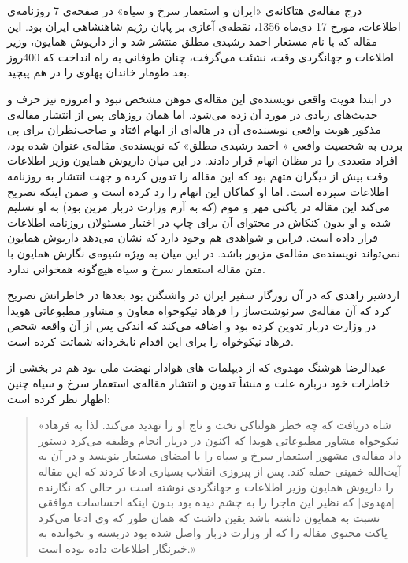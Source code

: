 \documentclass{article}
\begin{document}
\par
درج مقاله‌ی هتاکانه‌ی «ایران و استعمار سرخ و سیاه» در صفحه‌ی 7 روزنامه‌ی اطلاعات، مورخ 17 دی‌ماه 1356، نقطه‌ی آغازی بر پایان رژیم شاهنشاهی ایران بود. این مقاله که با نام مستعار احمد رشیدی مطلق منتشر شد و از داریوش همایون، وزیر اطلاعات و جهانگردی وقت، نشئت می‌گرفت، چنان طوفانی به راه انداخت که 400روز بعد طومار خاندان پهلوی را در هم پیچید.
\par
در ابتدا هویت واقعی نویسنده‌ی این مقاله‌ی موهن مشخص نبود و امروزه نیز حرف و حدیث‌های زیادی در مورد آن زده می‌شود. اما همان روزهای پس از انتشار مقاله‌ی مذكور هويت واقعی نويسنده‌ی آن در هاله‌ای از ابهام افتاد و صاحب‌نظران برای پی بردن به شخصيت واقعی « احمد رشيدی مطلق» كه نويسنده‌ی مقاله‌ی عنوان شده بود، افراد متعددی را در مظان اتهام قرار دادند. در اين ميان داريوش همايون وزير اطلاعات وقت بيش از ديگران متهم بود كه اين مقاله را تدوين كرده و جهت انتشار به روزنامه اطلاعات سپرده است. اما او كماكان اين اتهام را رد كرده است و ضمن اينكه تصريح می‌كند اين مقاله در پاكتی مهر و موم (كه به آرم وزارت دربار مزين بود) به او تسليم شده و او بدون كنكاش در محتوای آن برای چاپ در اختيار مسئولان روزنامه اطلاعات قرار داده است. قراين و شواهدی هم وجود دارد كه نشان می‌دهد داريوش همايون نمی‌تواند نويسنده‌ی مقاله‌ی مزبور باشد. در اين ميان به ويژه شيوه‌ی نگارش همايون با متن مقاله استعمار سرخ و سياه هيچ‌گونه همخوانی ندارد.
\par
اردشير زاهدی كه در آن روزگار سفير ايران در واشنگتن بود بعدها در خاطراتش تصريح كرد كه آن مقاله‌ی سرنوشت‌ساز را فرهاد نيكوخواه معاون و مشاور مطبوعاتی هويدا در وزارت دربار تدوين كرده بود و اضافه می‌كند كه اندكی پس از آن واقعه شخص فرهاد نيكوخواه را برای اين اقدام نابخردانه شماتت كرده است.
\par
عبدالرضا هوشنگ مهدوی که از دیپلمات های هوادار نهضت ملی بود هم در بخشی از خاطرات خود درباره علت و منشأ تدوين و انتشار مقاله‌ی استعمار سرخ و سياه چنين اظهار نظر كرده است:
\begin{quote}
«شاه دريافت كه چه خطر هولناکی تخت و تاج او را تهديد می‌کند. لذا به فرهاد نيكوخواه مشاور مطبوعاتی هويدا كه اكنون در دربار انجام وظيفه می‌كرد دستور داد مقاله‌ی مشهور استعمار سرخ و سياه را با امضای مستعار بنويسد و در آن به آيت‌الله خمينی حمله كند. پس از پيروزی انقلاب بسياری ادعا كردند كه اين مقاله را داريوش همايون وزير اطلاعات و جهانگردی نوشته است در حالی كه نگارنده [مهدوی] كه نظير اين ماجرا را به چشم ديده بود بدون اينكه احساسات موافقی نسبت به همايون داشته باشد يقين داشت كه همان طور كه وی ادعا می‌کرد پاكت محتوی مقاله را كه از وزارت دربار واصل شده بود دربسته و نخوانده به خبرنگار اطلاعات داده بوده است.»
\end{quote}
\end{document}
